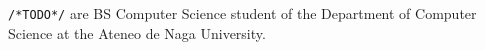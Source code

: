 \begin{vita}
\verb|/*TODO*/| are BS Computer Science student of the
Department of Computer Science at the Ateneo de Naga University.
\end{vita}

